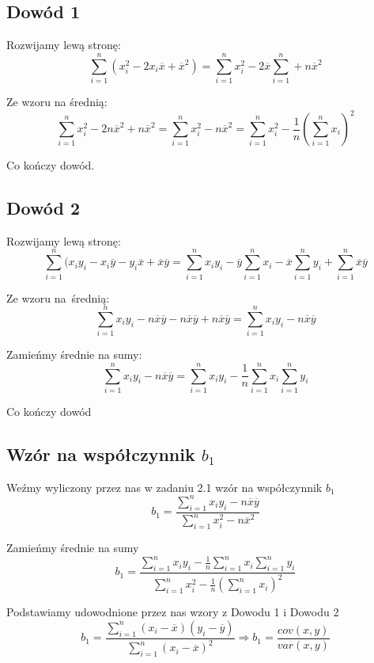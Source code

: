 \documentclass[11pt]{article}
\begin{document}
\pagebreak

\subsection{Dowód 1}
Rozwijamy lewą stronę:
\begin{equation}
  \sum_{i=1}^{n}(x_i^2 - 2x_i\overline{x} + \overline{x}^2) = \sum_{i=1}^{n} x_i^2 - 2\overline{x}\sum_{i=1}^{n} + n\overline{x}^2
\end{equation}

Ze wzoru na średnią:
\begin{equation}
  \sum_{i=1}^{n}x_i^2 - 2n\overline{x}^2 + n\overline{x}^2 = \sum_{i=1}^{n} x_i^2 - n\overline{x}^2
  = \sum_{i=1}^{n} x_i^2 - \frac{1}{n} (\sum_{i=1}^{n} x_i)^2
\end{equation}

Co kończy dowód.

\subsection{Dowód 2}
Rozwijamy lewą stronę:
\begin{equation}
  \sum_{i=1}^{n}(x_i y_i - x_i \overline{y} - y_i \overline{x} + \overline{x}\overline{y}
  = \sum_{i=1}^{n}x_iy_i - \overline{y}\sum_{i=1}^{n}x_i - \overline{x}\sum_{i=1}^{n}y_i + \sum_{i=1}^{n}\overline{x}\overline{y}
\end{equation}

Ze wzoru na średnią:
\begin{equation}
  \sum_{i=1}^{n}x_i y_i - n\overline{x}\overline{y} - n\overline{x}\overline{y} + n\overline{x}\overline{y} = \sum_{i=1}^{n}x_i y_i - n\overline{x}\overline{y}
\end{equation}

Zamieńmy średnie na sumy:
\begin{equation}
  \sum_{i=1}^{n}x_i y_i - n\overline{x}\overline{y} =\sum_{i=1}^{n}x_i y_i - \frac{1}{n}\sum_{i=1}^{n} x_i \sum_{i=1}^{n}y_i
\end{equation}

Co kończy dowód

\subsection{Wzór na współczynnik $b_1$}
Weźmy wyliczony przez nas w zadaniu 2.1 wzór na współczynnik $b_1$
\begin{equation}
  b_1 = \frac{\sum_{i=1}^{n} x_i y_i - n\overline{x}\overline{y}}{\sum_{i=1}^{n} x_i^2 - n \overline{x}^2}
\end{equation}

Zamieńmy średnie na sumy
\begin{equation}
  b_1 = \frac{\sum_{i=1}^{n} x_i y_i - \frac{1}{n}\sum_{i=1}^{n}x_i\sum_{i=1}^{n}y_i}{\sum_{i=1}^{n} x_i^2 - \frac{1}{n}(\sum_{i=1}^{n}x_i)^2}
\end{equation}

Podstawiamy udowodnione przez nas wzory z Dowodu 1 i Dowodu 2
\begin{equation}
  b_1 = \frac{\sum_{i=1}^{n}(x_i-\overline{x})(y_i-\overline{y})}{\sum_{i=1}^{n}(x_i-\overline{x})^2} \Rightarrow b_1=\frac{cov(x,y)}{var(x,y)}
\end{equation}
\end{document}
